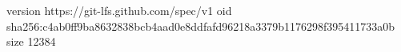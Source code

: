 version https://git-lfs.github.com/spec/v1
oid sha256:c4ab0ff9ba8632838bcb4aad0e8ddfafd96218a3379b1176298f395411733a0b
size 12384
